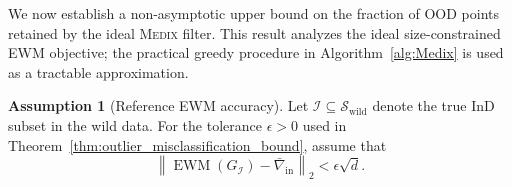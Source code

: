 \documentclass[10pt]{article} %
\theoremstyle{plain}
\theoremstyle{definition}
\newtheorem{assumption}[theorem]{Assumption}
\begin{document}
We now establish a non-asymptotic upper bound on the fraction of OOD points retained by the ideal \textsc{Medix} filter. This result analyzes the ideal size-constrained EWM objective; the practical greedy procedure in Algorithm~\ref{alg:Medix} is used as a tractable approximation.

\begin{assumption}[Reference EWM accuracy]
\label{assump:reference_ewm_accuracy}
Let \(\mathcal{I}\subseteq\mathcal{S}_{\mathrm{wild}}\) denote the true InD subset in the wild data. For the tolerance \(\epsilon>0\) used in Theorem~\ref{thm:outlier_misclassification_bound}, assume that
\begin{equation*}
\left\|
\operatorname{EWM}\left(G_{\mathcal{I}}\right)
-
\bar{\nabla}_{\mathrm{in}}
\right\|_2
<
\epsilon\sqrt{d}.
\end{equation*}
\end{assumption}
\end{document}

